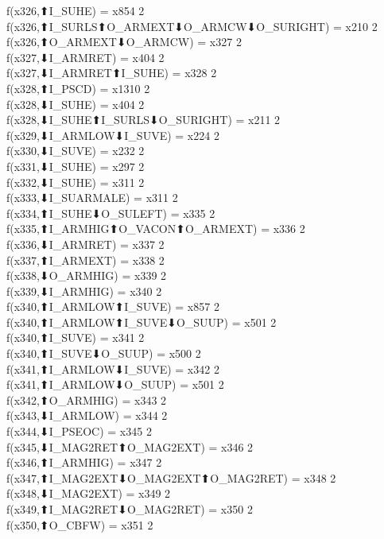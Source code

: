 f(x326,⬆I_SUHE) = x854 {2} \\
f(x326,⬆I_SURLS⬆O_ARMEXT⬇O_ARMCW⬇O_SURIGHT) = x210 {2} \\
f(x326,⬆O_ARMEXT⬇O_ARMCW) = x327 {2} \\
f(x327,⬇I_ARMRET) = x404 {2} \\
f(x327,⬇I_ARMRET⬆I_SUHE) = x328 {2} \\
f(x328,⬆I_PSCD) = x1310 {2} \\
f(x328,⬇I_SUHE) = x404 {2} \\
f(x328,⬇I_SUHE⬆I_SURLS⬇O_SURIGHT) = x211 {2} \\
f(x329,⬇I_ARMLOW⬇I_SUVE) = x224 {2} \\
f(x330,⬇I_SUVE) = x232 {2} \\
f(x331,⬇I_SUHE) = x297 {2} \\
f(x332,⬇I_SUHE) = x311 {2} \\
f(x333,⬇I_SUARMALE) = x311 {2} \\
f(x334,⬆I_SUHE⬇O_SULEFT) = x335 {2} \\
f(x335,⬆I_ARMHIG⬆O_VACON⬆O_ARMEXT) = x336 {2} \\
f(x336,⬇I_ARMRET) = x337 {2} \\
f(x337,⬆I_ARMEXT) = x338 {2} \\
f(x338,⬇O_ARMHIG) = x339 {2} \\
f(x339,⬇I_ARMHIG) = x340 {2} \\
f(x340,⬆I_ARMLOW⬆I_SUVE) = x857 {2} \\
f(x340,⬆I_ARMLOW⬆I_SUVE⬇O_SUUP) = x501 {2} \\
f(x340,⬆I_SUVE) = x341 {2} \\
f(x340,⬆I_SUVE⬇O_SUUP) = x500 {2} \\
f(x341,⬆I_ARMLOW⬇I_SUVE) = x342 {2} \\
f(x341,⬆I_ARMLOW⬇O_SUUP) = x501 {2} \\
f(x342,⬆O_ARMHIG) = x343 {2} \\
f(x343,⬇I_ARMLOW) = x344 {2} \\
f(x344,⬇I_PSEOC) = x345 {2} \\
f(x345,⬇I_MAG2RET⬆O_MAG2EXT) = x346 {2} \\
f(x346,⬆I_ARMHIG) = x347 {2} \\
f(x347,⬆I_MAG2EXT⬇O_MAG2EXT⬆O_MAG2RET) = x348 {2} \\
f(x348,⬇I_MAG2EXT) = x349 {2} \\
f(x349,⬆I_MAG2RET⬇O_MAG2RET) = x350 {2} \\
f(x350,⬆O_CBFW) = x351 {2} \\

